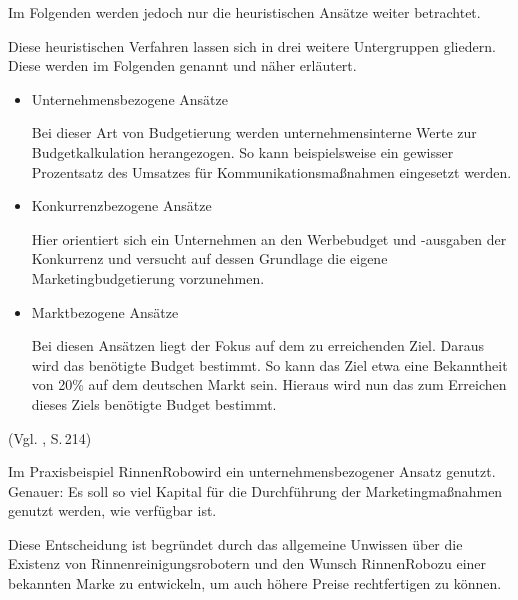     \noindent
    Im Folgenden werden jedoch nur die heuristischen Ansätze weiter betrachtet.

    \noindent
    Diese heuristischen Verfahren lassen sich in drei weitere Untergruppen gliedern. Diese werden im Folgenden genannt
    und näher erläutert.

    \begin{itemize}
        \item Unternehmensbezogene Ansätze
            
            Bei dieser Art von Budgetierung werden unternehmensinterne Werte zur Budgetkalkulation herangezogen. So kann
            beispielsweise ein gewisser Prozentsatz des Umsatzes für Kommunikationsmaßnahmen eingesetzt werden.

        \item Konkurrenzbezogene Ansätze
        
            Hier orientiert sich ein Unternehmen an den Werbebudget und -ausgaben der Konkurrenz und versucht auf dessen
            Grundlage die eigene Marketingbudgetierung vorzunehmen.

        \item Marktbezogene Ansätze
        
            Bei diesen Ansätzen liegt der Fokus auf dem zu erreichenden Ziel. Daraus wird das benötigte Budget bestimmt.
            So kann das Ziel etwa eine Bekanntheit von 20\% auf dem deutschen Markt sein. Hieraus wird nun das zum
            Erreichen dieses Ziels benötigte Budget bestimmt.
    \end{itemize} (Vgl. \cite{Brun2014}, S.\,214)

    \noindent
    Im Praxisbeispiel \as RinnenRobo\adl wird ein unternehmensbezogener Ansatz genutzt. Genauer: Es soll so viel
    Kapital für die Durchführung der Marketingmaßnahmen genutzt werden, wie verfügbar ist.

    \noindent
    Diese Entscheidung ist begründet durch das allgemeine Unwissen über die Existenz von Rinnenreinigungsrobotern und
    den Wunsch \as RinnenRobo\adl zu einer bekannten Marke zu entwickeln, um auch höhere Preise rechtfertigen zu
    können.

